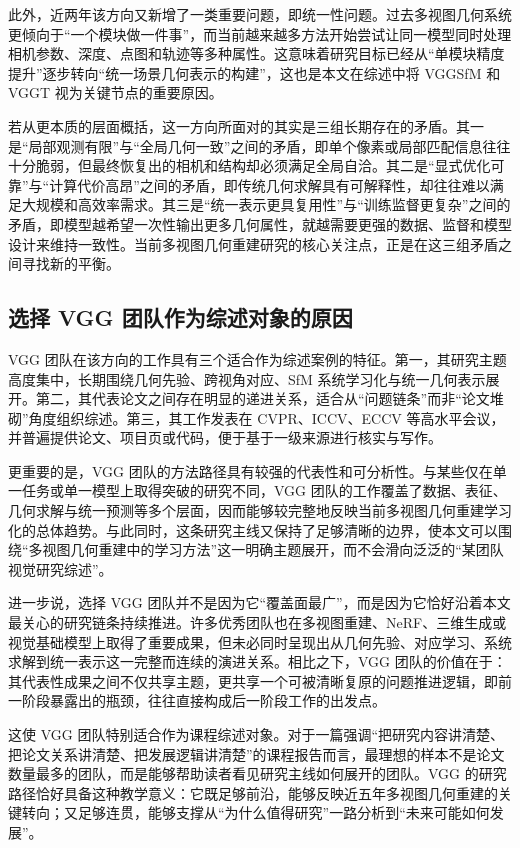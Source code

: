 此外，近两年该方向又新增了一类重要问题，即统一性问题。过去多视图几何系统更倾向于“一个模块做一件事”，而当前越来越多方法开始尝试让同一模型同时处理相机参数、深度、点图和轨迹等多种属性\cite{wang2025vggt,wang2024dust3r,mast3r2024}。这意味着研究目标已经从“单模块精度提升”逐步转向“统一场景几何表示的构建”，这也是本文在综述中将 VGGSfM 和 VGGT 视为关键节点的重要原因。

若从更本质的层面概括，这一方向所面对的其实是三组长期存在的矛盾。其一是“局部观测有限”与“全局几何一致”之间的矛盾，即单个像素或局部匹配信息往往十分脆弱，但最终恢复出的相机和结构却必须满足全局自洽。其二是“显式优化可靠”与“计算代价高昂”之间的矛盾，即传统几何求解具有可解释性，却往往难以满足大规模和高效率需求。其三是“统一表示更具复用性”与“训练监督更复杂”之间的矛盾，即模型越希望一次性输出更多几何属性，就越需要更强的数据、监督和模型设计来维持一致性。当前多视图几何重建研究的核心关注点，正是在这三组矛盾之间寻找新的平衡。

\subsection{选择 VGG 团队作为综述对象的原因}

VGG 团队在该方向的工作具有三个适合作为综述案例的特征。第一，其研究主题高度集中，长期围绕几何先验、跨视角对应、SfM 系统学习化与统一几何表示展开。第二，其代表论文之间存在明显的递进关系，适合从“问题链条”而非“论文堆砌”角度组织综述。第三，其工作发表在 CVPR、ICCV、ECCV 等高水平会议，并普遍提供论文、项目页或代码，便于基于一级来源进行核实与写作\cite{bhalgat2023lighttouch,wang2024vggsfm,wang2025vggt}。

更重要的是，VGG 团队的方法路径具有较强的代表性和可分析性。与某些仅在单一任务或单一模型上取得突破的研究不同，VGG 团队的工作覆盖了数据、表征、几何求解与统一预测等多个层面，因而能够较完整地反映当前多视图几何重建学习化的总体趋势。与此同时，这条研究主线又保持了足够清晰的边界，使本文可以围绕“多视图几何重建中的学习方法”这一明确主题展开，而不会滑向泛泛的“某团队视觉研究综述”。

进一步说，选择 VGG 团队并不是因为它“覆盖面最广”，而是因为它恰好沿着本文最关心的研究链条持续推进。许多优秀团队也在多视图重建、NeRF、三维生成或视觉基础模型上取得了重要成果，但未必同时呈现出从几何先验、对应学习、系统求解到统一表示这一完整而连续的演进关系。相比之下，VGG 团队的价值在于：其代表性成果之间不仅共享主题，更共享一个可被清晰复原的问题推进逻辑，即前一阶段暴露出的瓶颈，往往直接构成后一阶段工作的出发点。

这使 VGG 团队特别适合作为课程综述对象。对于一篇强调“把研究内容讲清楚、把论文关系讲清楚、把发展逻辑讲清楚”的课程报告而言，最理想的样本不是论文数量最多的团队，而是能够帮助读者看见研究主线如何展开的团队。VGG 的研究路径恰好具备这种教学意义：它既足够前沿，能够反映近五年多视图几何重建的关键转向；又足够连贯，能够支撑从“为什么值得研究”一路分析到“未来可能如何发展”。

